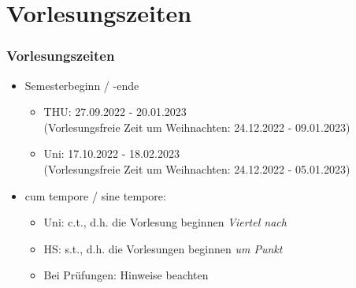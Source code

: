 \documentclass[10pt,a4paper]{beamer}
\begin{document}
\begin{frame}
\begin{center}
    \end{center}
\end{frame}

\section{Vorlesungszeiten}
\begin{frame}
\frametitle{Vorlesungszeiten}
	\begin{itemize}
	\setlength{\itemsep}{10pt} %
		\item Semesterbeginn / -ende
		
		\begin{itemize}
		\setlength{\itemsep}{10pt} %
			\item THU: 27.09.2022 - 20.01.2023 \\ (Vorlesungsfreie Zeit um Weihnachten: 24.12.2022 - 09.01.2023)
			\item Uni: 17.10.2022 - 18.02.2023\\(Vorlesungsfreie Zeit um Weihnachten: 24.12.2022 - 05.01.2023)
		\end{itemize}
	
		\item cum tempore / sine tempore:
		\begin{itemize}
		\setlength{\itemsep}{10pt} %
			\item Uni: c.t., d.h. die Vorlesung beginnen \emph{Viertel nach}
			\item HS: s.t., d.h. die Vorlesungen beginnen \emph{um Punkt}
			\item Bei Prüfungen: Hinweise beachten
		\end{itemize}
	\end{itemize}
\end{frame}
\end{document}
